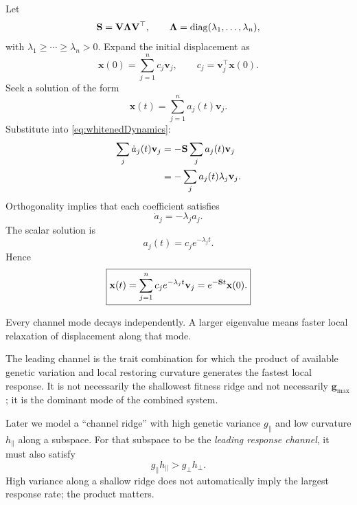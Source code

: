 Let
\begin{equation}
\mathbf{S}=\mathbf{V}\boldsymbol\Lambda\mathbf{V}^\top,
\qquad
\boldsymbol\Lambda=\operatorname{diag}(\lambda_1,\ldots,\lambda_n),
\end{equation}
with \(\lambda_1\ge\cdots\ge\lambda_n>0\). Expand the initial displacement as
\begin{equation}
\mathbf x(0)=\sum_{j=1}^nc_j\mathbf v_j,
\qquad
c_j=\mathbf v_j^\top\mathbf x(0).
\end{equation}
Seek a solution of the form
\begin{equation}
\mathbf x(t)=\sum_{j=1}^na_j(t)\mathbf v_j.
\end{equation}
Substitute into \cref{eq:whitenedDynamics}:
\begin{align}
\sum_j\dot a_j(t)\mathbf v_j
&=-\mathbf{S}\sum_ja_j(t)\mathbf v_j\\
&=-\sum_ja_j(t)\lambda_j\mathbf v_j.
\end{align}
Orthogonality implies that each coefficient satisfies
\begin{equation}
\dot a_j=-\lambda_ja_j.
\end{equation}
The scalar solution is
\begin{equation}
a_j(t)=c_je^{-\lambda_jt}.
\end{equation}
Hence
\begin{equation}
\boxed{\mathbf x(t)=\sum_{j=1}^nc_je^{-\lambda_jt}\mathbf v_j
=e^{-\mathbf{S} t}\mathbf x(0).}
\label{eq:modeSolution}
\end{equation}

\inwords Every channel mode decays independently. A larger eigenvalue means faster local relaxation of displacement along that mode.

\begin{biobox}
The leading channel is the trait combination for which the product of available genetic variation and local restoring curvature generates the fastest local response. It is not necessarily the shallowest fitness ridge and not necessarily \(\mathbf g_{\max}\); it is the dominant mode of the combined system.
\end{biobox}

\begin{cautionbox}[title={A terminology condition in the ridge model}]
Later we model a ``channel ridge'' with high genetic variance \(g_{\parallel}\) and low curvature \(h_{\parallel}\) along a subspace. For that subspace to be the \emph{leading response channel}, it must also satisfy
\[
g_{\parallel}h_{\parallel}>g_{\perp}h_{\perp}.
\]
High variance along a shallow ridge does not automatically imply the largest response rate; the product matters.
\end{cautionbox}


